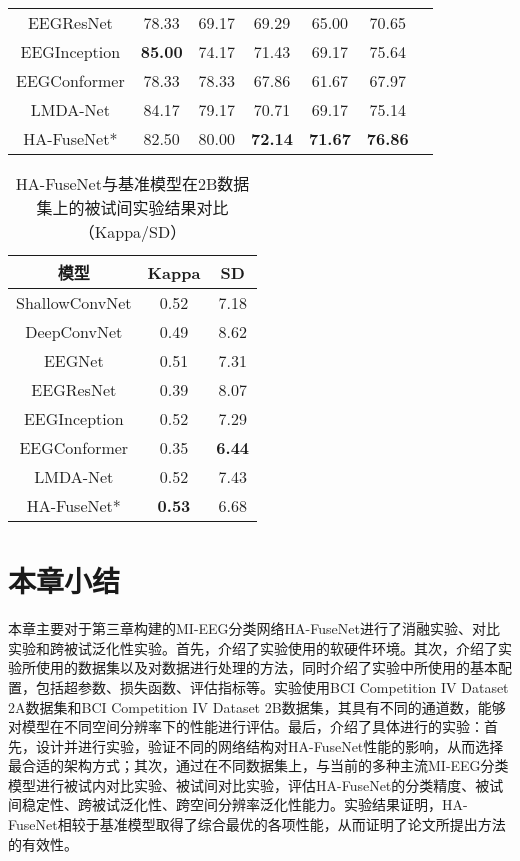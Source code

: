 \begin{table}[h]
\begin{subtable}[ht]{\textwidth}
\begin{tabularx}{\textwidth}{CCCCCCC}
        EEGResNet\cite{HBM:HBM23730}  & 78.33 & 69.17 & 69.29 & 65.00 & 70.65 \\
        EEGInception\cite{zhang2021eeg}  & \textbf{85.00} & 74.17 & 71.43 & 69.17 & 75.64 \\
        EEGConformer\cite{song2022eeg}  & 78.33 & 78.33 & 67.86 & 61.67 & 67.97 \\
        LMDA-Net\cite{miao2023lmda}  & 84.17 & 79.17 & 70.71 & 69.17 & 75.14 \\ 
        HA-FuseNet*  & 82.50 & 80.00 & \textbf{72.14} & \textbf{71.67} & \textbf{76.86}\\
        \bottomrule
      \end{tabularx}
    \end{subtable}
\end{table}

\begin{table}[H]
    \centering
    \caption{HA-FuseNet与基准模型在2B数据集上的被试间实验结果对比（Kappa/SD）}
    \label{tab:2bcomparecrosssd}
    \begin{tabularx}{\textwidth}{CCC}
      \toprule
      模型 & Kappa & SD \\
      \midrule
      ShallowConvNet\cite{schirrmeister2017deep} &0.52&7.18\\
      DeepConvNet\cite{schirrmeister2017deep} &0.49& 8.62 \\
      EEGNet\cite{lawhern2018eegnet} &0.51& 7.31\\
      EEGResNet\cite{HBM:HBM23730} &0.39 &8.07\\
      EEGInception\cite{zhang2021eeg} & 0.52 &7.29 \\
      EEGConformer\cite{song2022eeg} &0.35 &\textbf{6.44}\\
      LMDA-Net\cite{miao2023lmda} &0.52&7.43\\ 
      HA-FuseNet* &\textbf{0.53}&6.68\\
      \bottomrule
    \end{tabularx}
\end{table}

\section{本章小结}

本章主要对于第三章构建的MI-EEG分类网络HA-FuseNet进行了消融实验、对比实验和跨被试泛化性实验。首先，介绍了实验使用的软硬件环境。其次，介绍了实验所使用的数据集以及对数据进行处理的方法，同时介绍了实验中所使用的基本配置，包括超参数、损失函数、评估指标等。实验使用BCI Competition IV Dataset 2A数据集和BCI Competition IV Dataset 2B数据集，其具有不同的通道数，能够对模型在不同空间分辨率下的性能进行评估。最后，介绍了具体进行的实验：首先，设计并进行实验，验证不同的网络结构对HA-FuseNet性能的影响，从而选择最合适的架构方式；其次，通过在不同数据集上，与当前的多种主流MI-EEG分类模型进行被试内对比实验、被试间对比实验，评估HA-FuseNet的分类精度、被试间稳定性、跨被试泛化性、跨空间分辨率泛化性能力。实验结果证明，HA-FuseNet相较于基准模型取得了综合最优的各项性能，从而证明了论文所提出方法的有效性。